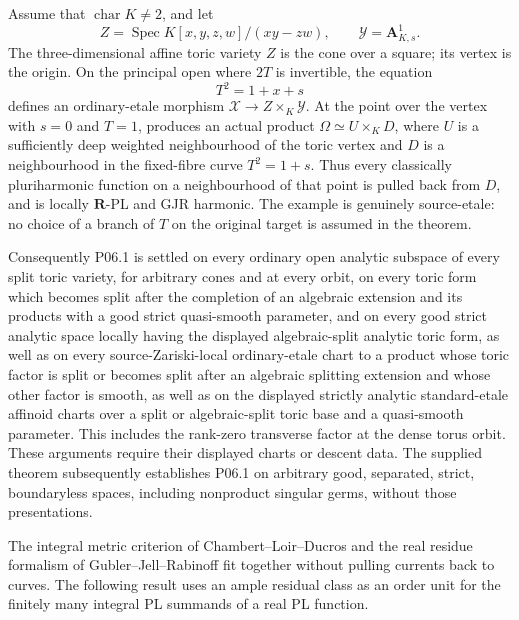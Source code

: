 \begin{example}
\label{ex:p061-etale-conifold-tube}
Assume that \(\operatorname{char}K\ne2\), and let
\[
 Z=\operatorname{Spec}
 K[x,y,z,w]/(xy-zw),
 \qquad \mathcal Y=\mathbf A^1_{K,s}.
\]
The three-dimensional affine toric variety \(Z\) is the cone over a square;
its vertex is the origin.  On the principal open where \(2T\) is invertible,
the equation
\[
                         T^2=1+x+s
\]
defines an ordinary-etale morphism
\(
 \mathcal X\to Z\times_K\mathcal Y
\).
At the point over the vertex with \(s=0\) and \(T=1\),
 produces an actual product
\(
 \Omega\simeq U\times_KD
\), where \(U\) is a sufficiently deep weighted neighbourhood of the
toric vertex and \(D\) is a neighbourhood in the fixed-fibre curve
\(T^2=1+s\).  Thus every classically pluriharmonic function on a
neighbourhood of that point is pulled back from \(D\), and is locally
\(\mathbf R\)-PL and GJR harmonic.  The example is genuinely source-etale:
no choice of a branch of \(T\) on the original target is assumed in the
theorem.
\end{example}

Consequently P06.1 is settled on every ordinary open analytic subspace of
every split toric variety, for arbitrary cones and at every orbit, on every
toric form which becomes split after the completion of an algebraic extension
and its products with a good strict quasi-smooth parameter, and on every
good strict analytic space locally having the displayed algebraic-split
analytic toric form, as well as on every source-Zariski-local ordinary-etale
chart to a product whose toric factor is
split or becomes split after an algebraic splitting extension and whose
other factor is smooth, as well as on the displayed strictly analytic
standard-etale affinoid charts over a split or algebraic-split toric base and
a quasi-smooth parameter.  This includes the rank-zero transverse factor at
the dense torus orbit. These arguments require their displayed charts or
descent data. The supplied theorem
 subsequently establishes
P06.1 on arbitrary good, separated, strict, boundaryless spaces, including
nonproduct singular germs, without those presentations.

The integral metric criterion of Chambert--Loir--Ducros and the real residue
formalism of Gubler--Jell--Rabinoff fit together without pulling currents
back to curves.  The following result uses an ample residual class as an
order unit for the finitely many integral PL summands of a real PL function.

